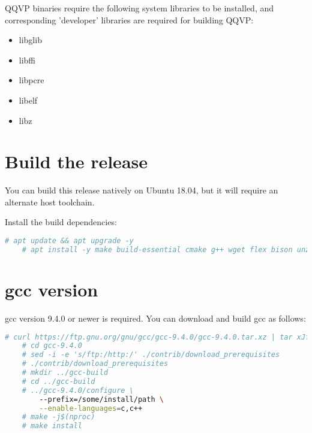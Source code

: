 QQVP binaries require the following system libraries to be installed, and corresponding 'developer' libraries are required for building QQVP:

\begin{itemize}
\item libglib
\item libffi
\item libpcre
\item libelf
\item libz
\end{itemize}


\section{Build the release}

You can build this release natively on Ubuntu 18.04, but it will require
an alternate host toolchain.

Install the build dependencies:

\small
\begin{lstlisting}[language=bash]
    # apt update && apt upgrade -y
    # apt install -y make build-essential cmake g++ wget flex bison unzip python python3-pip iproute2 ninja-build pkg-config libpixman-1-dev libglib2.0-dev git wget curl libelf-dev libvirglrenderer-dev libepoxy-dev libgtk-3-dev libsdl2-dev
\end{lstlisting}
\normalsize

\section{gcc version}

gcc version 9.4.0 or newer is required.  You can download and build gcc
as follows:

\small
\begin{lstlisting}[language=bash]
    # curl https://ftp.gnu.org/gnu/gcc/gcc-9.4.0/gcc-9.4.0.tar.xz | tar xJf -
    # cd gcc-9.4.0
    # sed -i -e 's/ftp:/http:/' ./contrib/download_prerequisites
    # ./contrib/download_prerequisites
    # mkdir ../gcc-build
    # cd ../gcc-build
    # ../gcc-9.4.0/configure \
        --prefix=/some/install/path \
        --enable-languages=c,c++
    # make -j$(nproc)
    # make install
\end{lstlisting}
\normalsize


\clearpage
